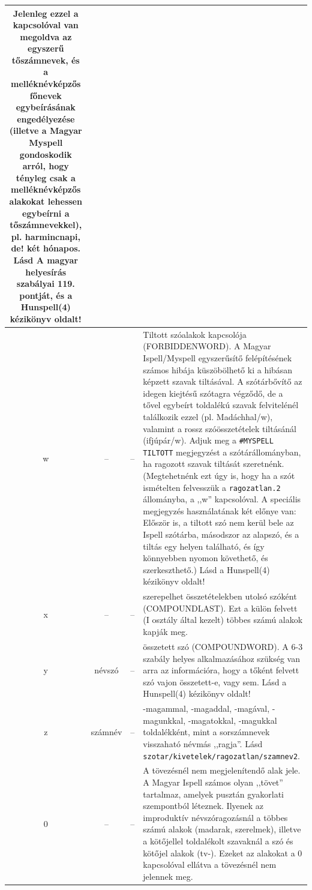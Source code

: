 \begin{longtable}[l]{cclp{12cm}}
Jelenleg ezzel a kapcsolóval van megoldva az egyszerű tőszámnevek, és a melléknévképzős főnevek
egybeírásának engedélyezése (illetve a Magyar Myspell gondoskodik arról, hogy
tényleg csak a melléknévképzős alakokat lehessen egybeírni a tőszámnevekkel), pl.
harmincnapi, de! két hónapos. Lásd A magyar helyesírás szabályai 119. pontját,
és a Hunspell(4) kézikönyv oldalt!
\\ \hline  w & -- & -- & Tiltott szóalakok kapcsolója (FORBIDDENWORD).
A Magyar Ispell/Myspell egyszerűsítő felépítésének számos hibája küszöbölhető
ki a hibásan képzett szavak tiltásával. A szótárbővítő az idegen
kiejtésű szótagra végződő, de a tővel egybeírt toldalékú szavak felvitelénél
találkozik ezzel (pl. Madáchhal/w), valamint a rossz szóösszetételek
tiltásánál (ifjúpár/w). Adjuk meg a \texttt{\#MYSPELL TILTOTT} megjegyzést
a szótárállományban, ha ragozott szavak tiltását szeretnénk. (Megtehetnénk
ezt úgy is, hogy ha a szót ismételten felvesszük a \texttt{ragozatlan.2}
állományba, a ,,w'' kapcsolóval. A speciális megjegyzés használatának két
előnye van: Először is, a tiltott szó nem kerül bele az Ispell szótárba,
másodszor az alapszó, és a tiltás egy helyen található, és így
könnyebben nyomon követhető, és szerkeszthető.) Lásd a Hunspell(4) kézikönyv oldalt!
\\ \hline  x & -- & -- & szerepelhet összetételekben utolsó szóként (COMPOUNDLAST).
Ezt a külön felvett (I osztály által kezelt) többes számú alakok kapják meg.
\\ \hline  y & névszó & -- & összetett szó (COMPOUNDWORD). A 6-3 szabály
helyes alkalmazásához szükség van arra az információra, hogy a tőként felvett
szó vajon összetett-e, vagy sem. Lásd a Hunspell(4) kézikönyv oldalt!
\\ \hline  z & számnév & -- & -magammal, -magaddal, -magával, -magunkkal, -magatokkal,
-magukkal toldalékként, mint a sorszámnevek visszaható névmás ,,ragja''.
Lásd \texttt{szotar/kivetelek/ragozatlan/szamnev2}.
\\ \hline 0 & -- & -- & A tövezésnél nem megjelenítendő alak jele.
A Magyar Ispell számos olyan ,,tövet'' tartalmaz, amelyek pusztán
gyakorlati szempontból léteznek. Ilyenek az improduktív névszóragozásnál
a többes számú alakok (madarak, szerelmek), illetve a kötőjellel toldalékolt szavaknál
a szó és kötőjel alakok (tv-). Ezeket az alakokat a 0 kapcsolóval
ellátva a tövezésnél nem jelennek meg.

\\ \hline \end{longtable}


